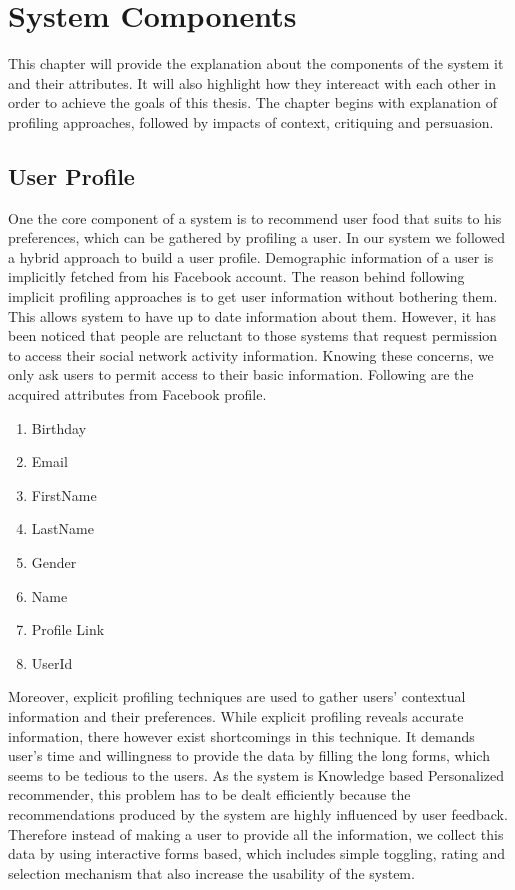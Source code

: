 
\chapter{System Components}

This chapter will provide the explanation about the components of the system it and their attributes. It will also highlight how they intereact with each other in order to achieve the goals of this thesis. The chapter begins with explanation of profiling approaches, followed by impacts of context, critiquing and persuasion.

\section{User Profile}

One the core component of a system is to recommend user food that suits to his preferences, which can be gathered by profiling a user. In our system we followed a hybrid approach to build a user profile. Demographic information of a user is implicitly fetched from his Facebook account. The reason behind following implicit profiling approaches is to get user information without bothering them. This allows system to have up to date information about them.  However, it has been noticed that people are reluctant to those systems that request permission to access their social network activity information. Knowing these concerns, we only ask users to permit access to their basic information. Following are the acquired attributes from Facebook profile.

\begin{enumerate}
	\item Birthday
	\item Email	
	\item FirstName
	\item LastName
	\item Gender
	\item Name
	\item Profile Link
	\item UserId
\end{enumerate}

Moreover, explicit profiling techniques are used to gather users' contextual information and their preferences. While explicit profiling reveals accurate information, there however exist shortcomings in this technique. It demands user’s time and willingness to provide the data by filling the long forms, which seems to be tedious to the users. As the system is Knowledge based Personalized recommender, this problem has to be dealt efficiently because the recommendations produced by the system are highly influenced by user feedback. Therefore instead of making a user to provide all the information, we collect this data by using interactive forms based, which includes simple toggling, rating and selection mechanism that also increase the usability of the system.


